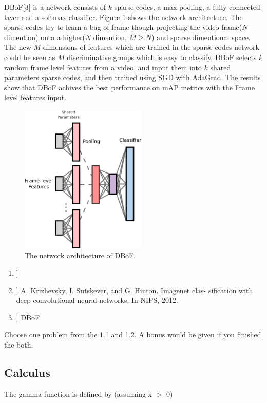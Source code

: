 \documentclass[a4paper]{article}
\begin{document}
DBoF[3] is a network consists of $k$ sparse codes, a max pooling, a fully connected layer and a softmax classifier. Figure \ref{dbof} shows the network architecture. The sparse codes try to learn a bag of frame though projecting the video frame($N$ dimention) onto a higher($N$ dimention, $M \ge N$) and sparse dimentional space. The new $M$-dimensions of features which are trained in the sparse codes network could be seen as $M$ discriminative groups which is easy to classify. DBoF selects $k$ random frame level features from a video, and input them into $k$ shared parameters sparse codes, and then trained using SGD with AdaGrad. The results show that DBoF achives the best performance on mAP metrics with the Frame level features input. 
\begin{figure}[!htbp]
\begin{center}
\includegraphics[width=6cm]{DBoF.jpg}
\end{center}
\caption{The network architecture of DBoF.}\label{dbof}
\end{figure}


\begin{enumerate}
  \item[[1]]
  \item[[2]] A. Krizhevsky, I. Sutskever, and G. Hinton. Imagenet clas- sification with deep convolutional neural networks. In NIPS, 2012.
  \item[[3]] DBoF
\end{enumerate}


Choose one problem from the 1.1 and 1.2. A bonus would be given if you finished the both.

\subsection{Calculus}
The gamma function is defined by (assuming x $>$ 0)
\end{document}
